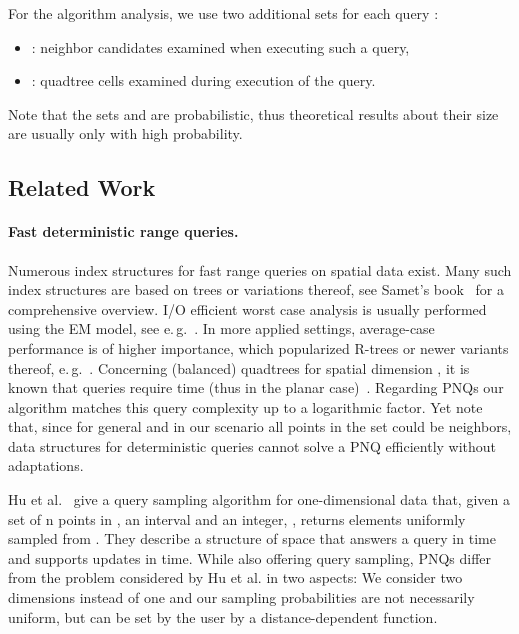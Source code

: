\documentclass{llncs}
\newcommand{\eg}{e.\,g.\xspace}
\begin{document}
For the algorithm analysis, we use two additional sets for each query :
\begin{itemize}
 \item : neighbor candidates examined when executing such a query,
 \item : quadtree cells examined during execution of the query.
\end{itemize}
Note that the sets  and  are probabilistic, thus theoretical results about their size are usually only with high probability.

\subsection{Related Work}
\label{sec:related}
\paragraph{Fast deterministic range queries.}
Numerous index structures for fast range queries on spatial data exist.
Many such index structures are based on trees or variations 
thereof, see Samet's book~\cite{Samet:2005:FMM:1076819} for a comprehensive overview.
I/O efficient worst case analysis is usually performed using the EM model,
see \eg~\cite{Arge:2012:ISD:2367574.2367575}. In more applied settings, average-case performance is of
higher importance, which popularized R-trees or newer variants thereof, \eg~\cite{Kamel:1994:HRI:645920.673001}.
Concerning (balanced) quadtrees for spatial dimension , it is known that queries require  time
(thus  in the planar case)~\cite[Ch.~1.4]{Samet:2005:FMM:1076819}.
Regarding PNQs our algorithm matches this query complexity up to a logarithmic factor.
Yet note that, since for general  and  in our scenario all points in the set  could be neighbors, 
data structures for deterministic queries cannot solve a PNQ efficiently without adaptations.

Hu et al.~\cite{Hu2014independent} give a query sampling algorithm for one-dimensional data that,
given a set  of n points in ,  an interval  and an integer, , returns  elements uniformly sampled from .
They describe a structure of  space that answers a query in  time and supports updates in  time.
While also offering query sampling, PNQs differ from the problem considered by Hu et al. in two aspects: We consider two dimensions instead of one and our sampling probabilities are not necessarily uniform,
but can be set by the user by a distance-dependent function.
\end{document}

